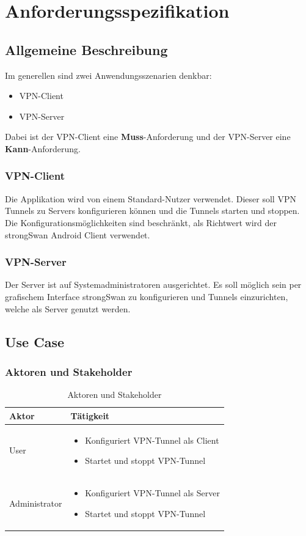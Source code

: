 \section{Anforderungsspezifikation}
\subsection{Allgemeine Beschreibung}
Im generellen sind zwei Anwendungsszenarien denkbar:
\begin{itemize}
	\item VPN-Client
	\item VPN-Server
\end{itemize}
\medskip
Dabei ist der VPN-Client eine \textbf{Muss}-Anforderung und der VPN-Server eine \textbf{Kann}-Anforderung.
\medskip
\subsubsection{VPN-Client}
Die Applikation wird von einem Standard-Nutzer verwendet. Dieser soll VPN Tunnels zu Servers konfigurieren können und die Tunnels starten und stoppen. Die Konfigurationsmöglichkeiten sind beschränkt, als Richtwert wird der strongSwan Android Client verwendet.\\


\subsubsection{VPN-Server}
Der Server ist auf Systemadministratoren ausgerichtet. Es soll möglich sein per grafischem Interface strongSwan zu konfigurieren und Tunnels einzurichten, welche als Server genutzt werden. 

\subsection{Use Case}
\subsubsection{Aktoren und Stakeholder}
\begin{table}[H]
\centering
    \begin{tabular}{|p{3cm}|p{9cm}|}
    \hline
    \rowcolor{lightblue}
    Aktor & Tätigkeit   \\ \hline
	User  & 
			\begin{itemize}
			\item Konfiguriert VPN-Tunnel als Client
    		\item Startet und stoppt VPN-Tunnel
		\end{itemize}	
	\\ \hline
	Administrator & 
			\begin{itemize}
			\item Konfiguriert VPN-Tunnel als Server
    		\item Startet und stoppt VPN-Tunnel
		\end{itemize}	
	\\ \hline
	\end{tabular}
    \caption[Aktoren und Stakeholder]{Aktoren und Stakeholder}
\end{table}




